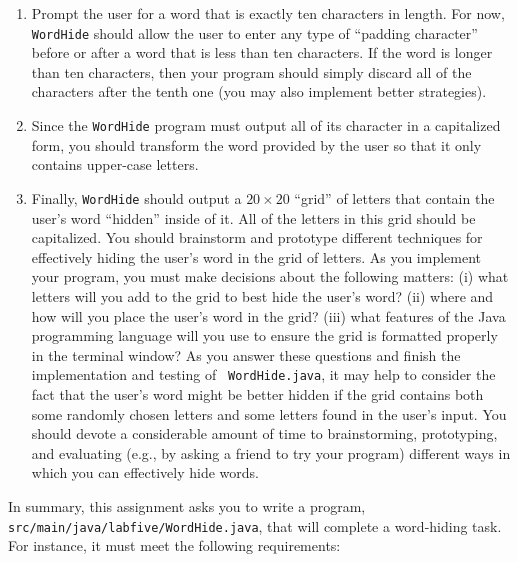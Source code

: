 \documentclass[11pt]{article}
\newcommand{\mainprogramsource}{\lstinline{src/main/java/labfive/WordHide.java}}
\begin{document}
\vspace*{-.1in}

\begin{enumerate}

  \itemsep0in

  \item Prompt the user for a word that is exactly ten characters in length. For
    now, {\tt WordHide} should allow the user to enter any type of ``padding
    character'' before or after a word that is less than ten characters. If the
    word is longer than ten characters, then your program should simply discard
    all of the characters after the tenth one (you may also implement better
    strategies).

  \item Since the {\tt WordHide} program must output all of its character in a
    capitalized form, you should transform the word provided by the user so that
    it only contains upper-case letters.

  \item Finally, {\tt WordHide} should output a $20 \times 20$ ``grid'' of
    letters that contain the user's word ``hidden'' inside of it. All of the
    letters in this grid should be capitalized. You should brainstorm and
    prototype different techniques for effectively hiding the user's word in the
    grid of letters. As you implement your program, you must make decisions
    about the following matters: (i) what letters will you add to the grid to
    best hide the user's word? (ii) where and how will you place the user's word
    in the grid? (iii) what features of the Java programming language will you
    use to ensure the grid is formatted properly in the terminal window? As you
    answer these questions and finish the implementation and testing of {\tt
    WordHide.java}, it may help to consider the fact that the user's word might
    be better hidden if the grid contains both some randomly chosen letters and
    some letters found in the user's input. You should devote a considerable
    amount of time to brainstorming, prototyping, and evaluating (e.g., by
    asking a friend to try your program) different ways in which you can
    effectively hide words.

\end{enumerate}

\vspace*{-.1in}

In summary, this assignment asks you to write a program, \mainprogramsource{},
that will complete a word-hiding task. For instance, it must meet the following
requirements:
\end{document}
